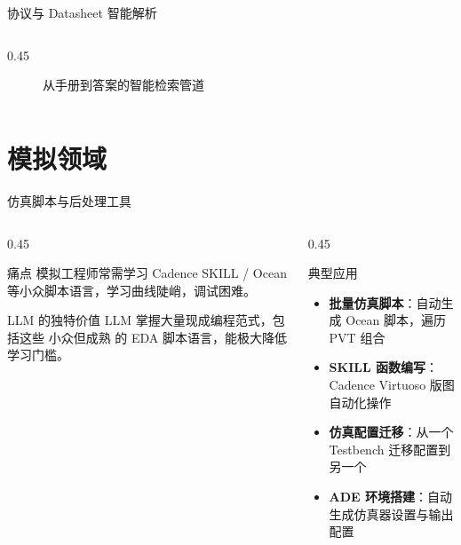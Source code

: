 \documentclass[aspectratio=169, 10pt, UTF8]{ctexbeamer}
\begin{document}
\begin{frame}{协议与 Datasheet 智能解析}
\begin{columns}[T]
\begin{column}{0.45\textwidth}
\begin{figure}
        \caption{从手册到答案的智能检索管道}
      \end{figure}
    \end{column}
  \end{columns}
\end{frame}

\section{模拟领域}

\begin{frame}{仿真脚本与后处理工具}
  \begin{columns}[T]
    \begin{column}{0.45\textwidth}
      \begin{alertblock}{痛点}
        模拟工程师常需学习 Cadence SKILL / Ocean 等小众脚本语言，学习曲线陡峭，调试困难。
      \end{alertblock}

      \begin{exampleblock}{LLM 的独特价值}
        LLM 掌握大量现成编程范式，包括这些 \alert{小众但成熟} 的 EDA 脚本语言，能极大降低学习门槛。
      \end{exampleblock}
    \end{column}
    \begin{column}{0.45\textwidth}
      \begin{block}{典型应用}
        \begin{itemize}
          \item \textbf{批量仿真脚本}：自动生成 Ocean 脚本，遍历 PVT 组合
          \item \textbf{SKILL 函数编写}：Cadence Virtuoso 版图自动化操作
          \item \textbf{仿真配置迁移}：从一个 Testbench 迁移配置到另一个
          \item \textbf{ADE 环境搭建}：自动生成仿真器设置与输出配置
        \end{itemize}
      \end{block}
    \end{column}
  \end{columns}
\end{frame}
\end{document}
